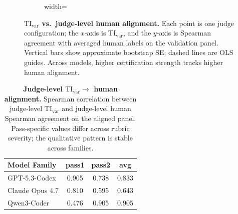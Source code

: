 \documentclass{article}
\begin{document}
\begin{figure}[t]
\begin{subfigure}[t]{0.30\textwidth}
\begin{adjustbox}{width=\linewidth}
    \end{adjustbox}
  \end{subfigure}
  \caption{\textbf{$\mathrm{TI}_{\mathrm{var}}$ vs.\ judge-level human alignment.}
  Each point is one judge configuration; the \(x\)-axis is \(\mathrm{TI}_{\mathrm{var}}\), and the \(y\)-axis is Spearman agreement with averaged human labels on the validation panel.
  Vertical bars show approximate bootstrap SE; dashed lines are OLS guides.
  Across models, higher certification strength tracks higher human alignment.}
  \label{fig:tivar_cross_model_avg}
  \vspace{-2mm}
\end{figure}

\begin{table}[t]
  \centering
  \small
  \begin{tabular}{lccc}
    \toprule
    \textbf{Model Family} & \textbf{pass1} & \textbf{pass2} & \textbf{avg} \\
    \midrule
    GPT-5.3-Codex         & 0.905          & 0.738          & 0.833        \\
    Claude Opus 4.7       & 0.810          & 0.595          & 0.643        \\
    Qwen3-Coder           & 0.476          & 0.905          & 0.905        \\
    \bottomrule
  \end{tabular}
  \caption{\textbf{Judge-level \(\mathrm{TI}_{\mathrm{var}}\rightarrow\) human alignment.}
  Spearman correlation between judge-level \(\mathrm{TI}_{\mathrm{var}}\) and judge-level human Spearman agreement on the aligned panel. Pass-specific values differ across rubric severity; the qualitative pattern is stable across families.}
  \label{tab:tivar_cross_model_results}
\end{table}
\end{document}
